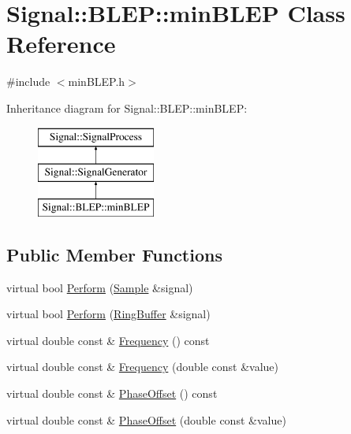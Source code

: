 \hypertarget{class_signal_1_1_b_l_e_p_1_1min_b_l_e_p}{\section{Signal\+:\+:B\+L\+E\+P\+:\+:min\+B\+L\+E\+P Class Reference}
\label{class_signal_1_1_b_l_e_p_1_1min_b_l_e_p}
}


{\ttfamily \#include $<$min\+B\+L\+E\+P.\+h$>$}

Inheritance diagram for Signal\+:\+:B\+L\+E\+P\+:\+:min\+B\+L\+E\+P\+:\begin{figure}[H]
\begin{center}
\leavevmode
\includegraphics[height=3.000000cm]{class_signal_1_1_b_l_e_p_1_1min_b_l_e_p}
\end{center}
\end{figure}
\subsection*{Public Member Functions}
\begin{DoxyCompactItemize}
\item 
virtual bool \hyperlink{class_signal_1_1_signal_generator_a2cd9061c5ae40a392a9476551b4379f3}{Perform} (\hyperlink{class_signal_1_1_sample}{Sample} \&signal)
\item 
virtual bool \hyperlink{class_signal_1_1_signal_generator_a126d52dd9b6b14d33efc624e2c89284e}{Perform} (\hyperlink{class_signal_1_1_ring_buffer}{Ring\+Buffer} \&signal)
\item 
virtual double const \& \hyperlink{class_signal_1_1_signal_generator_a96af42ee68f94e9b04d034fd68b73ecd}{Frequency} () const 
\item 
virtual double const \& \hyperlink{class_signal_1_1_signal_generator_af83b532bf3ddc3637c2fd7a1dfd095cb}{Frequency} (double const \&value)
\item 
virtual double const \& \hyperlink{class_signal_1_1_signal_generator_ac2538ec946f001e394d2416fda698d1c}{Phase\+Offset} () const 
\item 
virtual double const \& \hyperlink{class_signal_1_1_signal_generator_ac6a103ff72beaa338f6d18c812522d78}{Phase\+Offset} (double const \&value)
\end{DoxyCompactItemize}
